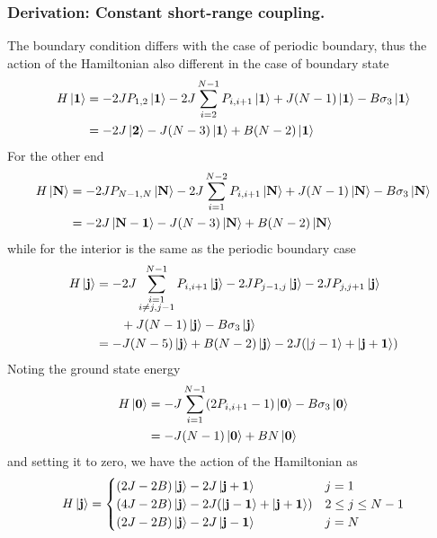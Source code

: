 \documentclass[../../../main.tex]{subfiles}
\begin{document}
\subsubsection{Derivation: Constant short-range coupling.}
The boundary condition differs with the case of periodic boundary,  thus the action of the Hamiltonian also different in the case of boundary state
\begin{align*}
    H \ket{\mathbf{1}}
     & =   -2J P_{1,2} \ket{\mathbf{1}}    -2J \sum_{i  = 2}^{N-1}  P_{i,i+1}\ket{\mathbf{1}} + J(N-1) \ket{\mathbf{1}} - B\sigma_3\ket{\mathbf{1}} \\
     & =  -2 J \ket{\mathbf{2}} -J (N-3) \ket{\mathbf{1}} + B (N-2) \ket{\mathbf{1}}
\end{align*}
For the other end
\begin{align*}
    H \ket{\mathbf{N}}
     & =   -2J P_{N-1,N} \ket{\mathbf{N}} -2J \sum_{i  = 1}^{N-2}  P_{i,i+1}\ket{\mathbf{N}} + J(N-1) \ket{\mathbf{N}} - B\sigma_3 \ket{\mathbf{N}} \\
     & =  -2 J \ket{\mathbf{N-1}} -J (N-3) \ket{\mathbf{N}} + B (N-2) \ket{\mathbf{N}}
\end{align*}
while for the interior is the same as the periodic boundary case
\begin{align*}
    H \ket{\mathbf{j}}
     & =   - 2J \sum_{\substack{i=1                                                             \\i\neq j,j-1}}^{N-1}  P_{i,i+1}\ket{\mathbf{j}} -2JP_{j-1,j} \ket{\mathbf{j}} - 2JP_{j,j+1} \ket{\mathbf{j}} \\
     & \qquad+  J(N-1) \ket{\mathbf{j}} - B\sigma_3 \ket{\mathbf{j}}                            \\
     & = -J(N-5) \ket{\mathbf{j}}+B(N-2) \ket{\mathbf{j}}-2J ( \ket{j-1 } + \ket{\mathbf{j+1}})
\end{align*}
Noting the ground state energy
\begin{align*}
    H \ket{\mathbf{0}}
     & =  -J \sum_{i  = 1}^{N-1}  (2P_{i,i+1}-1)\ket{\mathbf{0}}   - B\sigma_3 \ket{\mathbf{0}} \\
     & =  -J (N-1) \ket{\mathbf{0}} + B N \ket{\mathbf{0}}
\end{align*}
and setting it to zero, we have the action of the Hamiltonian as
\begin{equation*}
    H \ket{\mathbf{j}} =
    \begin{cases}
        (2J-2B)\ket{\mathbf{j}} -2 J \ket{\mathbf{j+1}}                      & j=1              \\
        (4J-2B) \ket{\mathbf{j}} - 2J(\ket{\mathbf{j-1}}+\ket{\mathbf{j+1}}) & 2\leq j \leq N-1 \\
        (2J-2B)\ket{\mathbf{j}} -2 J \ket{\mathbf{j-1}}                      & j=N              \\
    \end{cases}
\end{equation*}
\end{document}
